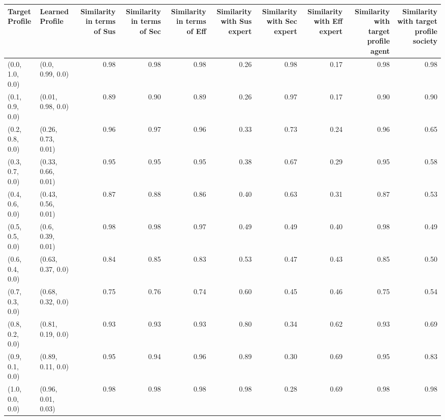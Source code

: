 \begin{tabular}{llrrrrrrrr}
\toprule
Target Profile & Learned Profile & Similarity in terms of Sus & Similarity in terms of Sec & Similarity in terms of Eff & Similarity with Sus expert & Similarity with Sec expert & Similarity with Eff expert & Similarity with target profile agent & Similarity with target profile society \\
\midrule
(0.0, 1.0, 0.0) & (0.0, 0.99, 0.0) & 0.98 & 0.98 & 0.98 & 0.26 & 0.98 & 0.17 & 0.98 & 0.98 \\
(0.1, 0.9, 0.0) & (0.01, 0.98, 0.0) & 0.89 & 0.90 & 0.89 & 0.26 & 0.97 & 0.17 & 0.90 & 0.90 \\
(0.2, 0.8, 0.0) & (0.26, 0.73, 0.01) & 0.96 & 0.97 & 0.96 & 0.33 & 0.73 & 0.24 & 0.96 & 0.65 \\
(0.3, 0.7, 0.0) & (0.33, 0.66, 0.01) & 0.95 & 0.95 & 0.95 & 0.38 & 0.67 & 0.29 & 0.95 & 0.58 \\
(0.4, 0.6, 0.0) & (0.43, 0.56, 0.01) & 0.87 & 0.88 & 0.86 & 0.40 & 0.63 & 0.31 & 0.87 & 0.53 \\
(0.5, 0.5, 0.0) & (0.6, 0.39, 0.01) & 0.98 & 0.98 & 0.97 & 0.49 & 0.49 & 0.40 & 0.98 & 0.49 \\
(0.6, 0.4, 0.0) & (0.63, 0.37, 0.0) & 0.84 & 0.85 & 0.83 & 0.53 & 0.47 & 0.43 & 0.85 & 0.50 \\
(0.7, 0.3, 0.0) & (0.68, 0.32, 0.0) & 0.75 & 0.76 & 0.74 & 0.60 & 0.45 & 0.46 & 0.75 & 0.54 \\
(0.8, 0.2, 0.0) & (0.81, 0.19, 0.0) & 0.93 & 0.93 & 0.93 & 0.80 & 0.34 & 0.62 & 0.93 & 0.69 \\
(0.9, 0.1, 0.0) & (0.89, 0.11, 0.0) & 0.95 & 0.94 & 0.96 & 0.89 & 0.30 & 0.69 & 0.95 & 0.83 \\
(1.0, 0.0, 0.0) & (0.96, 0.01, 0.03) & 0.98 & 0.98 & 0.98 & 0.98 & 0.28 & 0.69 & 0.98 & 0.98 \\
\bottomrule
\end{tabular}
